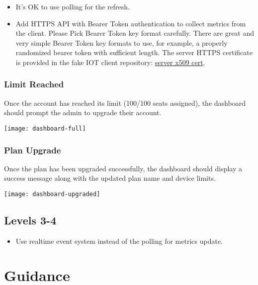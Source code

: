 \documentclass{article}
\begin{document}
  \begin{itemize}
  \item It's OK to use polling for the refresh.
  \item Add HTTPS API with Bearer Token authentication to collect metrics from the client.
     Please Pick Bearer Token key format carefully. There are great and very simple Bearer Token key formats to use, for example, a properly randomized bearer token with sufficient length. The server HTTPS certificate is provided in the fake IOT client repository: \href{https://github.com/gravitational/fakeiot/tree/master/fixtures}{server x509 cert}.
  \end{itemize}

  \subsubsection{Limit Reached}
   Once the account has reached its limit (100/100 seats assigned), the dashboard should prompt the admin to upgrade their account.

  \begin{center}
  \texttt{[image: dashboard-full]}
  \end{center}

  \subsubsection{Plan Upgrade}

  Once the plan has been upgraded successfully, the dashboard should display a success message along with the updated plan name and device limits.

  \begin{center}
    \texttt{[image: dashboard-upgraded]}
  \end{center}

  \subsection*{Levels 3-4}

  \begin{itemize}
  \item Use realtime event system instead of the polling for metrics update.
  \end{itemize}

\section{Guidance}
\end{document}
